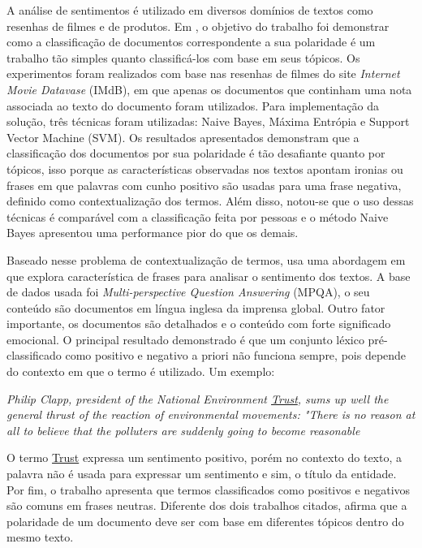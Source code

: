 \documentclass[a4paper,12pt]{article}
\begin{document}
A análise de sentimentos é utilizado em diversos domínios de textos como resenhas de filmes e de produtos. Em \cite{thumbsup}, o objetivo do trabalho foi demonstrar como a classificação de documentos correspondente a sua polaridade é um trabalho tão simples quanto classificá-los com base em seus tópicos. Os experimentos foram realizados com base nas resenhas de filmes do site \textit{Internet Movie Datavase} (IMdB), em que apenas os documentos que continham uma nota associada ao texto do documento foram utilizados. Para implementação da solução, três técnicas foram utilizadas: Naive Bayes, Máxima Entrópia e Support Vector Machine (SVM). Os resultados apresentados demonstram que a classificação dos documentos por sua polaridade é tão desafiante quanto por tópicos, isso porque as características observadas nos textos apontam ironias ou frases em que palavras com cunho positivo são usadas para uma frase negativa, definido como contextualização dos termos. Além disso, notou-se que o uso dessas técnicas é comparável com a classificação feita por pessoas e o método Naive Bayes apresentou uma performance pior do que os demais.

Baseado nesse problema de contextualização de termos, \cite{contextualpolarity} usa uma abordagem em que explora característica de frases para analisar o sentimento dos textos. A base de dados usada foi \textit{Multi-perspective Question Answering} (MPQA), o seu conteúdo são documentos em língua inglesa da imprensa global. Outro fator importante, os documentos são detalhados e o conteúdo com forte significado emocional. O principal resultado demonstrado é que um conjunto léxico pré-classificado como positivo e negativo a priori não funciona sempre, pois depende do contexto em que o termo é utilizado. Um exemplo: 

\emph{Philip Clapp, president of the National Environment \underline{Trust}, sums up well the general thrust of the reaction of environmental movements: "There is no reason at all to believe that the polluters are suddenly going to become reasonable}

O termo \underline{Trust} expressa um sentimento positivo, porém no contexto do texto, a palavra não é usada para expressar um sentimento e sim, o título da entidade. Por fim, o trabalho apresenta que termos classificados como positivos e negativos são comuns em frases neutras. Diferente dos dois trabalhos citados, \cite{SA} afirma que a polaridade de um documento deve ser com base em diferentes tópicos dentro do mesmo texto.
\end{document}
